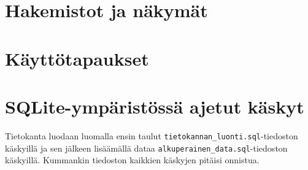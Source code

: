 \documentclass[12pt,titlepage] {article}
\begin{document}
\section {Hakemistot ja näkymät}



\section {Käyttötapaukset}



\section {SQLite-ympäristössä ajetut käskyt}

Tietokanta luodaan luomalla ensin taulut \verb|tietokannan_luonti.sql|-tiedoston käskyillä ja sen jälkeen lisäämällä dataa \verb|alkuperainen_data.sql|-tiedoston käskyillä. Kummankin tiedoston kaikkien käskyjen pitäisi onnistua.
\end{document}
